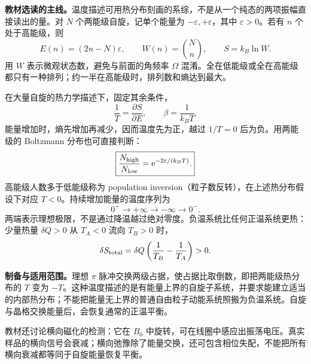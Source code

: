 \textbf{教材选读的主线。}温度描述可用热分布刻画的系综，不是从一个纯态的两项振幅直接读出的量。对 $N$ 个两能级自旋，记单个能量为 $-\varepsilon,+\varepsilon$，其中 $\varepsilon>0$。若有 $n$ 个处于高能级，则
\begin{equation}
  E(n)=(2n-N)\varepsilon,\qquad
  W(n)=\binom Nn,\qquad S=k_B\ln W.
\end{equation}
用 $W$ 表示微观状态数，避免与前面的角频率 $\Omega$ 混淆。全在低能级或全在高能级都只有一种排列；约一半在高能级时，排列数和熵达到最大。

在大量自旋的热力学描述下，固定其余条件，
\begin{equation}
  \boxed{\frac1T=\frac{\partial S}{\partial E},\qquad
  \beta=\frac1{k_BT}.}
\end{equation}
能量增加时，熵先增加再减少，因而温度先为正，越过 $1/T=0$ 后为负。用两能级的 Boltzmann 分布也可直接判断：
\begin{equation}
  \boxed{\frac{N_{\rm high}}{N_{\rm low}}
     =\mathrm{e}^{-2\varepsilon/(k_BT)}.}
\end{equation}
高能级人数多于低能级称为 population inversion（粒子数反转），在上述热分布假设下对应 $T<0$。持续增加能量的温度序列为
\begin{equation}
  0^+\longrightarrow+\infty\longrightarrow-\infty\longrightarrow0^-.
\end{equation}
两端表示理想极限，不是通过降温越过绝对零度。负温系统比任何正温系统更热：少量热量 $\delta Q>0$ 从 $T_A<0$ 流向 $T_B>0$ 时，
\begin{equation}
  \delta S_{\rm total}=\delta Q\left(\frac1{T_B}-\frac1{T_A}\right)>0.
\end{equation}

\textbf{制备与适用范围。}理想 $\pi$ 脉冲交换两级占据，使占据比取倒数，即把两能级热分布的 $T$ 变为 $-T$。这种温度描述的是有能量上界的自旋子系统，并要求能建立适当的内部热分布；不能把能量无上界的普通自由粒子动能系统照搬为负温系统。自旋与晶格交换能量后，会恢复通常的正温平衡。


教材还讨论横向磁化的检测：它在 $B_0$ 中旋转，可在线圈中感应出振荡电压。真实样品的横向信号会衰减；横向弛豫除了能量交换，还可包含相位失配，不能把所有横向衰减都等同于自旋能量恢复平衡。

